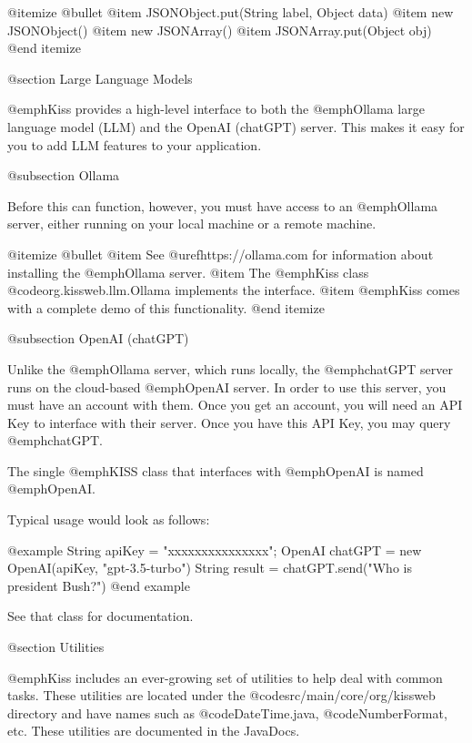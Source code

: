 @itemize @bullet
@item
JSONObject.put(String label, Object data)
@item
new JSONObject()
@item
new JSONArray()
@item
JSONArray.put(Object obj)
@end itemize

@section Large Language Models

@emph{Kiss} provides a high-level interface to both the @emph{Ollama} large language model (LLM) and the OpenAI (chatGPT) server. This makes it easy for you to add LLM features to your application.

@subsection Ollama

Before this can function, however, you must have access to an @emph{Ollama} server, either running on your local machine or a remote machine.

@itemize @bullet
@item
See @uref{https://ollama.com} for information about installing the @emph{Ollama} server.
@item
The @emph{Kiss} class @code{org.kissweb.llm.Ollama} implements the interface.
@item
@emph{Kiss} comes with a complete demo of this functionality.
@end itemize

@subsection OpenAI (chatGPT)

Unlike the @emph{Ollama} server, which runs locally, the @emph{chatGPT}
server runs on the cloud-based @emph{OpenAI} server.  In order to use
this server, you must have an account with them.  Once you get an
account, you will need an API Key to interface with their server.
Once you have this API Key, you may query @emph{chatGPT}.

The single @emph{KISS} class that interfaces with @emph{OpenAI} is
named @emph{OpenAI}.  

Typical usage would look as follows:

@example
    String apiKey = "xxxxxxxxxxxxxxx";
    OpenAI chatGPT = new OpenAI(apiKey, "gpt-3.5-turbo")
    String result = chatGPT.send("Who is president Bush?")
@end example

See that class for documentation.

@section Utilities

@emph{Kiss} includes an ever-growing set of utilities to help deal with common tasks.
These utilities are located under the @code{src/main/core/org/kissweb} directory and have names such as
@code{DateTime.java}, @code{NumberFormat}, etc.  These utilities
are documented in the JavaDocs.
